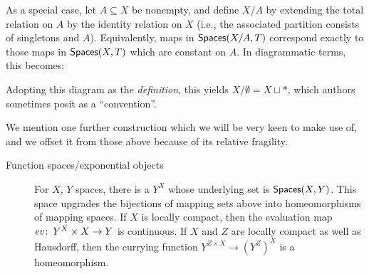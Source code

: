 \begin{description}
    As a special case, let $A \subseteq X$ be nonempty, and define $X/A$ by extending the total relation on $A$ by the identity relation on $X$ (i.e., the associated partition consists of singletons and $A$).
    Equivalently, maps in $\mathsf{Spaces}(X/A, T)$ correspond exactly to those maps in $\mathsf{Spaces}(X, T)$ which are constant on $A$.
    In diagrammatic terms, this becomes:
    \begin{center}
    \end{center}
    Adopting this diagram as the \emph{definition}, this yields $X / \emptyset = X \sqcup *$, which authors sometimes posit as a ``convention''.
\end{description}

\noindent
We mention one further construction which we will be very keen to make use of, and we offset it from those above because of its relative fragility.

\begin{description}
    \item[Function spaces/exponential objects]
    For $X$, $Y$ spaces, there is a  $Y^X$ whose underlying set is $\mathsf{Spaces}(X, Y)$.
    This space upgrades the bijections of mapping sets above into homeomorphisms of mapping spaces.
    If $X$ is locally compact, then the evaluation map $\mathit{ev}\colon\thinspace Y^X \times X \to Y$ is continuous.
    If $X$ and $Z$ are locally compact as well as Hausdorff, then the currying function $Y^{Z \times X} \to (Y^Z)^X$ is a homeomorphism.
\end{description}

